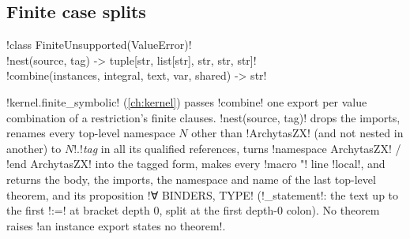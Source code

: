 {\subsection{Finite case splits}\label{sec:lean-export-net-finite}

\begin{signature}
\py!class FiniteUnsupported(ValueError)!\\
\py!nest(source, tag) -> tuple[str, list[str], str, str, str]!\\
\py!combine(instances, integral, text, var, shared) -> str!
\end{signature}
\noindent \py!kernel.finite_symbolic! (\cref{ch:kernel}) passes \py!combine! one export per value
combination of a restriction's finite clauses. \py!nest(source, tag)! drops the imports, renames
every top-level namespace $N$ other than \code!ArchytasZX! (and not nested in another) to
$N$\code!.!\textit{tag} in all its qualified references, turns \code!namespace ArchytasZX! /
\code!end ArchytasZX! into the tagged form, makes every \code!macro "! line \code!local!, and
returns the body, the imports, the namespace and name of the last top-level theorem, and its
proposition \code!∀ BINDERS, TYPE! (\py!_statement!: the text up to the first \code!:=! at bracket
depth 0, split at the first depth-0 colon). No theorem raises
\code!an instance export states no theorem!.

}
